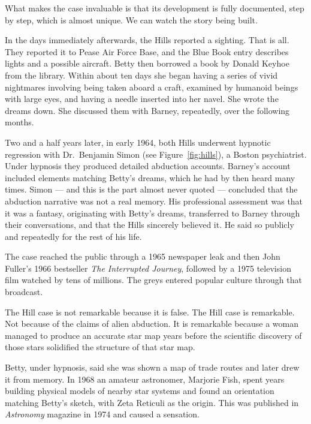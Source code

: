 What makes the case invaluable is that its development is fully documented, step by step, which
is almost unique. We can watch the story being built.

In the days immediately afterwards, the Hills reported a sighting. That is all. They reported
it to Pease Air Force Base, and the Blue Book entry describes lights and a possible aircraft.
Betty then borrowed a book by Donald Keyhoe from the library. Within about ten days she began
having a series of vivid nightmares involving being taken aboard a craft, examined by
humanoid beings with large eyes, and having a needle inserted into her navel. She wrote the
dreams down. She discussed them with Barney, repeatedly, over the following months.

Two and a half years later, in early 1964, both Hills underwent hypnotic regression with Dr.~Benjamin Simon (see Figure~\ref{fig:hills}), a Boston psychiatrist. Under hypnosis they produced detailed abduction
accounts. Barney's account included elements matching Betty's dreams, which he had by then
heard many times. Simon --- and this is the part almost never quoted --- concluded that the
abduction narrative was not a real memory. His professional assessment was that it was a
fantasy, originating with Betty's dreams, transferred to Barney through their conversations,
and that the Hills sincerely believed it. He said so publicly and repeatedly for the rest of
his life.

The case reached the public through a 1965 newspaper leak and then John Fuller's 1966
bestseller \emph{The Interrupted Journey}, followed by a 1975 television film watched by tens
of millions. The greys entered popular culture through that broadcast.

The Hill case is not remarkable because it is false. The Hill case is remarkable. Not
because of the claims of alien abduction. It is remarkable because a woman managed to
produce an accurate star map years before the scientific discovery of those stars solidified
the structure of that star map.

Betty, under hypnosis, said she was shown a map of trade routes and later drew it from
memory. In 1968 an amateur astronomer, Marjorie Fish, spent years building physical models
of nearby star systems and found an orientation matching Betty's sketch, with Zeta Reticuli
as the origin. This was published in \emph{Astronomy} magazine in 1974 and caused a
sensation.

